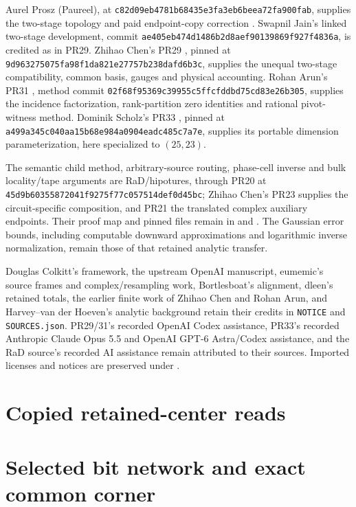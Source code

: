 \documentclass[11pt]{article}
\begin{document}
Aurel Prosz (Paureel), at
\texttt{c82d09eb4781b68435e3fa3eb6beea72fa900fab}, supplies the two-stage
topology and paid endpoint-copy correction \cite{paureel}. Swapnil Jain's
linked two-stage development, commit
\texttt{ae405eb474d1486b2d8aef90139869f927f4836a}, is credited as in
PR29. Zhihao Chen's PR29 \cite{pr29}, pinned at
\texttt{9d963275075fa98f1da821e27757b238dafd6b3c}, supplies the unequal
two-stage compatibility, common basis, gauges and physical accounting.
Rohan Arun's PR31 \cite{pr31}, method commit
\texttt{02f68f95369c39955c5ffcfddbd75cd83e26b305}, supplies the
incidence factorization, rank-partition zero identities and rational
pivot-witness method. Dominik Scholz's PR33 \cite{pr33}, pinned at
\texttt{a499a345c040aa15b68e984a0904eadc485c7a7e}, supplies its portable
dimension parameterization, here specialized to $(25,23)$.

The semantic child method, arbitrary-source routing, phase-cell inverse
and bulk locality/tape arguments are RaD/hipotures, through PR20 at
\texttt{45d9b60355872041f9275f77c057514def0d45bc}; Zhihao Chen's PR23
supplies the circuit-specific composition, and PR21 the translated
complex auxiliary endpoints. Their proof map and pinned files remain in
 and
. The Gaussian error bounds, including
computable downward approximations and logarithmic inverse normalization,
remain those of that retained analytic transfer.

Douglas Colkitt's framework, the upstream OpenAI manuscript, eumemic's
source frames and complex/resampling work, Bortlesboat's alignment,
dleen's retained totals, the earlier finite work of Zhihao Chen and
Rohan Arun, and Harvey--van der Hoeven's analytic background retain their
credits in \texttt{NOTICE} and \texttt{SOURCES.json}. PR29/31's recorded
OpenAI Codex assistance, PR33's recorded Anthropic Claude Opus 5.5 and
OpenAI GPT-6 Astra/Codex assistance, and the RaD source's recorded AI
assistance remain attributed to their sources. Imported licenses and
notices are preserved under .

\section{Copied retained-center reads}

\section{Selected bit network and exact common corner}

\end{document}
